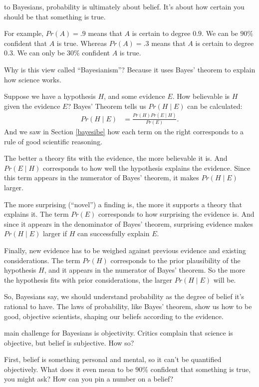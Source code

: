\documentclass[justified]{tufte-book}
\newcommand{\given}{\mid}
\newcommand{\p}{Pr}
\theoremstyle{definition}
\theoremstyle{definition}
\theoremstyle{definition}
\theoremstyle{remark}
\begin{document}
 to Bayesians, probability is ultimately about belief. It's about how certain you should be that something is true.

For example, \(\p(A)=.9\) means that \(A\) is certain to degree \(0.9\). We can be \(90\%\) confident that \(A\) is true. Whereas \(\p(A)=.3\) means that \(A\) is certain to degree \(0.3\). We can only be \(30\%\) confident \(A\) is true.

Why is this view called ``Bayesianism''? Because it uses Bayes' theorem to explain how science works.

Suppose we have a hypothesis \(H\), and some evidence \(E\). How believable is \(H\) given the evidence \(E\)? Bayes' Theorem tells us \(\p(H \given E)\) can be calculated:
\[
  \begin{aligned}
    \p(H \given E) &= \frac{\p(H)\p(E \given H)}{\p(E)}.
  \end{aligned}
\]
And we saw in Section \ref{bayesibe} how each term on the right corresponds to a rule of good scientific reasoning.

The better a theory fits with the evidence, the more believable it is. And \(\p(E \given H)\) corresponds to how well the hypothesis explains the evidence. Since this term appears in the numerator of Bayes' theorem, it makes \(\p(H \given E)\) larger.

The more surprising (``novel'') a finding is, the more it supports a theory that explains it. The term \(\p(E)\) corresponds to how surprising the evidence is. And since it appears in the denominator of Bayes' theorem, surprising evidence makes \(\p(H \given E)\) larger if \(H\) can successfully explain \(E\).

Finally, new evidence has to be weighed against previous evidence and existing considerations. The term \(\p(H)\) corresponds to the prior plausibility of the hypothesis \(H\), and it appears in the numerator of Bayes' theorem. So the more the hypothesis fits with prior considerations, the larger \(\p(H \given E)\) will be.

So, Bayesians say, we should understand probability as the degree of belief it's rational to have. The laws of probability, like Bayes' theorem, show us how to be good, objective scientists, shaping our beliefs according to the evidence.

 main challenge for Bayesians is objectivity. Critics complain that science is objective, but belief is subjective. How so?

First, belief is something personal and mental, so it can't be quantified objectively. What does it even mean to be \(90\%\) confident that something is true, you might ask? How can you pin a number on a belief?
\end{document}
